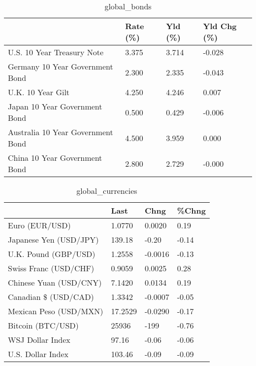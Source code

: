 \documentclass{article}%
\begin{document}
%


\begin{table}[htbp]%
\caption{global\_bonds}%
\centering%
\begin{adjustbox}{width=1\textwidth}%
\begin{tabular}{llll}
\toprule
                                  & Rate (\%) & Yld (\%) & Yld Chg (\%) \\
\midrule
       U.S. 10 Year Treasury Note &    3.375 &   3.714 &      -0.028 \\
  Germany 10 Year Government Bond &    2.300 &   2.335 &      -0.043 \\
                U.K. 10 Year Gilt &    4.250 &   4.246 &       0.007 \\
    Japan 10 Year Government Bond &    0.500 &   0.429 &      -0.006 \\
Australia 10 Year Government Bond &    4.500 &   3.959 &       0.000 \\
    China 10 Year Government Bond &    2.800 &   2.729 &      -0.000 \\
\bottomrule
\end{tabular}
%
\end{adjustbox}%
\end{table}

%


\begin{table}[htbp]%
\caption{global\_currencies}%
\centering%
\begin{adjustbox}{width=1\textwidth}%
\begin{tabular}{llll}
\toprule
                       &    Last &    Chng & \%Chng \\
\midrule
        Euro (EUR/USD) &  1.0770 &  0.0020 &  0.19 \\
Japanese Yen (USD/JPY) &  139.18 &   -0.20 & -0.14 \\
  U.K. Pound (GBP/USD) &  1.2558 & -0.0016 & -0.13 \\
 Swiss Franc (USD/CHF) &  0.9059 &  0.0025 &  0.28 \\
Chinese Yuan (USD/CNY) &  7.1420 &  0.0134 &  0.19 \\
  Canadian \$ (USD/CAD) &  1.3342 & -0.0007 & -0.05 \\
Mexican Peso (USD/MXN) & 17.2529 & -0.0290 & -0.17 \\
     Bitcoin (BTC/USD) &   25936 &    -199 & -0.76 \\
      WSJ Dollar Index &   97.16 &   -0.06 & -0.06 \\
     U.S. Dollar Index &  103.46 &   -0.09 & -0.09 \\
\bottomrule
\end{tabular}
%
\end{adjustbox}%
\end{table}
\end{document}
